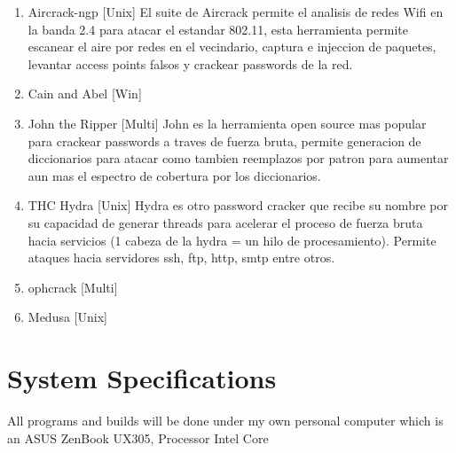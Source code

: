 \begin{enumerate}
\item{Aircrack-ngp [Unix]}
El suite de Aircrack permite el analisis de redes Wifi en la banda 2.4 para atacar el estandar 802.11, esta herramienta permite escanear el aire por redes en el vecindario, captura e injeccion de paquetes, levantar access points falsos y crackear passwords de la red.
\item{Cain and Abel [Win]}
\item{John the Ripper [Multi]}
John es la herramienta open source mas popular para crackear passwords a traves de fuerza bruta, permite generacion de diccionarios para atacar como tambien reemplazos por patron para aumentar aun mas el espectro de cobertura por los diccionarios.
\item{THC Hydra [Unix]}
Hydra es otro password cracker que recibe su nombre por su capacidad de generar threads para acelerar el proceso de fuerza bruta hacia servicios (1 cabeza de la hydra = un hilo de procesamiento). Permite ataques hacia servidores ssh, ftp, http, smtp entre otros.
\item{ophcrack [Multi]}
\item{Medusa [Unix]}


\end{enumerate}

\section{System Specifications}

All programs and builds will be done under my own personal computer which is an ASUS ZenBook UX305, Processor Intel Core \texttrademark




